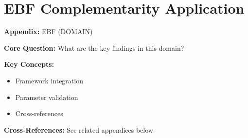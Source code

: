 %
%
%
%

\chapter{EBF Complementarity Application}
\label{app:domain-ebf}


\begin{tcolorbox}[colback=blue!5!white, colframe=blue!75!black,
    title=Quick Reference: Appendix UNMAPPED_EBF]

\textbf{Appendix:} EBF (DOMAIN)

\textbf{Core Question:} What are the key findings in this domain?

\textbf{Key Concepts:}
\begin{itemize}[nosep]
\item Framework integration
\item Parameter validation
\item Cross-references
\end{itemize}

\textbf{Cross-References:} See related appendices below
\end{tcolorbox}

\begin{abstract}
This appendix applies the mathematical theory of complementarity to the Evidence-Based
Framework (EBF) for behavioral change. We establish how complementarity operates across
the six FEPSDE utility dimensions, between intervention types, and across the Behavioral
Change Journey phases. The central insight is that behavioral interventions exhibit
strong complementarities: nudges work better with incentives, information is more
effective with defaults, and timing across BCJ phases creates multiplicative effects.
We provide specific $\gamma$ estimates for 15 intervention pairs and derive optimal
intervention portfolio strategies based on complementarity analysis.
\end{abstract}

